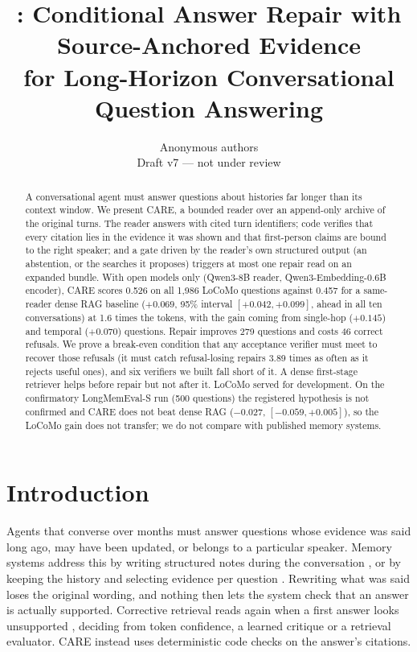 \documentclass[10pt]{article}
\title{\textbf{\care{}: Conditional Answer Repair with Source-Anchored Evidence\\
for Long-Horizon Conversational Question Answering}}
\author{Anonymous authors\\ \small Draft v7 --- not under review}
\date{}
\theoremstyle{plain}
\newcommand{\care}{\textsc{CARE}}
\begin{document}
\maketitle

\begin{abstract}
A conversational agent must answer questions about histories far longer than its context window. We present
\care{}, a bounded reader over an append-only archive of the original turns. The reader answers with cited
turn identifiers; code verifies that every citation lies in the evidence it was shown and that first-person
claims are bound to the right speaker; and a gate driven by the reader's own structured output (an abstention,
or the searches it proposes) triggers at most one repair read on an expanded bundle. With open models only
(Qwen3-8B reader, Qwen3-Embedding-0.6B encoder), \care{} scores 0.526 on all 1,986 LoCoMo questions against 0.457
for a same-reader dense RAG baseline ($+0.069$, 95\% interval $[+0.042,+0.099]$, ahead in all ten
conversations) at 1.6 times the tokens, with the gain coming from single-hop ($+0.145$) and temporal ($+0.070$)
questions. Repair improves 279 questions and costs 46 correct refusals. We prove a break-even condition that any
acceptance verifier must meet to recover those refusals (it must catch refusal-losing repairs 3.89 times as often as it
rejects useful ones), and six verifiers we built fall short of it. A dense first-stage retriever helps before repair
but not after it. LoCoMo served for development. On the confirmatory LongMemEval-S run (500 questions) the registered hypothesis is not
confirmed and \care{} does not beat dense RAG ($-0.027$, $[-0.059,+0.005]$), so the LoCoMo gain does not transfer; we do
not compare with published memory systems.
\end{abstract}

\section{Introduction}
\label{sec:intro}

Agents that converse over months must answer questions whose evidence was said long ago, may have
been updated, or belongs to a particular speaker. Memory systems address this by writing structured notes
during the conversation \citep{packer2023memgpt,chhikara2025mem0,amem2025,memoryr12025,cao2026higmem}, or by
keeping the history and selecting evidence per question \citep{du2026memr3,wang2026cuemem,liu2026livectx,chen2026justmem,yu2026lazymem}.
Rewriting what was said loses the original wording, and nothing then lets the system check that an answer is
actually supported. Corrective retrieval reads again when a first answer looks unsupported
\citep{jiang2023active,asai2023selfrag,yan2024crag}, deciding from token confidence, a learned critique or a retrieval
evaluator. \care{} instead uses deterministic code checks on the answer's citations.
\end{document}
